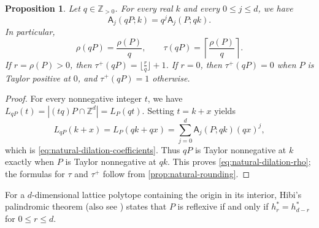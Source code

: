 \documentclass[reqno, 12pt]{article}
\numberwithin{equation}{section}
\newtheorem{proposition}[theorem]{Proposition}
\theoremstyle{definition}
\newcommand{\Z}{\mathbb{Z}}
\newcommand{\A}{\mathsf{A}}
\begin{document}
\begin{proposition}\label{prop:natural-dilation}
Let $q\in\Z_{>0}$.  For every real $k$ and every $0\leq j\leq d$, we have 
\begin{equation}\label{eq:natural-dilation-coefficients}
 \A_j(qP;k)=q^j\A_j(P;qk).
\end{equation}
In particular,
\begin{equation}\label{eq:natural-dilation-rho}
 \rho(qP)=\frac{\rho(P)}q,
 \qquad
 \tau(qP)=\left\lceil\frac{\rho(P)}q\right\rceil.
\end{equation}
If $r=\rho(P)>0$, then $\tau^+(qP)=\lfloor\frac rq\rfloor+1$.
If $r=0$, then $\tau^+(qP)=0$ when $P$ is Taylor positive at $0$, and $\tau^+(qP)=1$ otherwise.
\end{proposition}
\begin{proof}
For every nonnegative integer $t$, we have $L_{qP}(t)=|(tq)P\cap\Z^d|=L_P(qt)$.
Setting $t=k+x$ yields
\[L_{qP}(k+x)=L_P(qk+qx)=\sum_{j=0}^{d}\A_j(P;qk)(qx)^j,
\]
which is \eqref{eq:natural-dilation-coefficients}.  Thus $qP$ is Taylor nonnegative at $k$ exactly when $P$ is Taylor nonnegative at $qk$. This proves \eqref{eq:natural-dilation-rho}; the formulas for $\tau$ and $\tau^+$ follow from \cref{prop:natural-rounding}.
\end{proof}

For a $d$-dimensional lattice polytope containing the origin in its interior, Hibi's palindromic theorem \cite{Hibi1992} (also see \cite[Theorem 4.6]{BeckRobins2015}) states that $P$ is reflexive if and only if $h_r^*=h_{d-r}^*$ for $0\leq r\leq d$.
\end{document}
